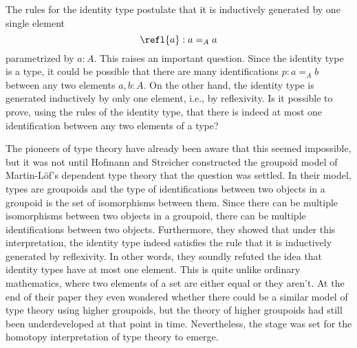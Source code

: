 The rules for the identity type postulate that it is inductively generated by one single element
\begin{equation*}
  \refl{a}:a=_A a
\end{equation*}
parametrized by $a:A$. This raises an important question. Since the identity type is a type, it could be possible that there are many identifications $p:a=_A b$ between any two elements $a,b:A$. On the other hand, the identity type is generated inductively by only one element, i.e., by reflexivity. Is it possible to prove, using the rules of the identity type, that there is indeed at most one identification between any two elements of a type?

The pioneers of type theory have already been aware that this seemed impossible, but it was not until Hofmann and Streicher constructed the groupoid model of Martin-L\"of's dependent type theory \cite{hs:gpd-typethy} that the question was settled. In their model, types are groupoids and the type of identifications between two objects in a groupoid is the set of isomorphisms between them. Since there can be multiple isomorphisms between two objects in a groupoid, there can be multiple identifications between two objects. Furthermore, they showed that under this interpretation, the identity type indeed satisfies the rule that it is inductively generated by reflexivity. In other words, they soundly refuted the idea that identity types have at most one element. This is quite unlike ordinary mathematics, where two elements of a set are either equal or they aren't. At the end of their paper they even wondered whether there could be a similar model of type theory using higher groupoids, but the theory of higher groupoids had still been underdeveloped at that point in time. Nevertheless, the stage was set for the homotopy interpretation of type theory to emerge.

